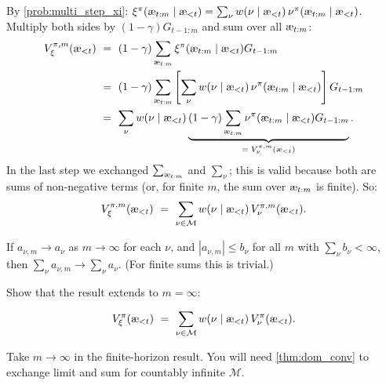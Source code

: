 \documentclass[fontsize=11pt, parskip=half]{scrartcl}
\newcommand{\cM}{\mathcal{M}}
\newcommand{\aes}{\textnormal{\ae}}
\begin{document}
\begin{solution}
By \cref{prob:multi_step_xi}: $\xi^\pi(\aes_{t:m} \mid \aes_{<t}) = \sum_\nu w(\nu \mid \aes_{<t})\, \nu^\pi(\aes_{t:m} \mid \aes_{<t})$.
Multiply both sides by $(1-\gamma)G_{t-1:m}$ and sum over all $\aes_{t:m}$:
\begin{align*}
    V_\xi^{\pi,m}(\aes_{<t})
    ~&=~ (1-\gamma) \sum_{\aes_{t:m}} \xi^\pi(\aes_{t:m} \mid \aes_{<t}) G_{t-1:m} \\
    ~&=~ (1-\gamma) \sum_{\aes_{t:m}} \left[\sum_\nu w(\nu \mid \aes_{<t})\, \nu^\pi(\aes_{t:m} \mid \aes_{<t})\right] G_{t-1:m} \\
    ~&=~ \sum_\nu w(\nu \mid \aes_{<t}) \underbrace{(1-\gamma) \sum_{\aes_{t:m}} \nu^\pi(\aes_{t:m} \mid \aes_{<t}) G_{t-1:m}}_{=\; V_\nu^{\pi,m}(\aes_{<t})}.
\end{align*}
In the last step we exchanged $\sum_{\aes_{t:m}}$ and $\sum_\nu$; this is valid because both are sums of non-negative terms (or, for finite $m$, the sum over $\aes_{t:m}$ is finite). So:
\[
    V_\xi^{\pi,m}(\aes_{<t}) ~=~ \sum_{\nu \in \cM} w(\nu \mid \aes_{<t})\, V_\nu^{\pi,m}(\aes_{<t}).
\]
\end{solution}

\begin{fact}\label{thm:dom_conv}
If $a_{\nu,m} \to a_\nu$ as $m \to \infty$ for each $\nu$, and $|a_{\nu,m}| \leq b_\nu$ for all $m$ with $\sum_\nu b_\nu < \infty$, then $\sum_\nu a_{\nu,m} \to \sum_\nu a_\nu$.
(For finite sums this is trivial.)
\end{fact}

\begin{exercise}
\label{prob:linearity_inf}
\skippable
Show that the result extends to $m = \infty$:

\[
    V_\xi^\pi(\aes_{<t})
    ~=~ \sum_{\nu \in \cM} w(\nu \mid \aes_{<t})\, V_\nu^\pi(\aes_{<t}).
\]

\begin{hint}
Take $m \to \infty$ in the finite-horizon result. You will need \cref{thm:dom_conv} to exchange limit and sum
for countably infinite $\cM$.
\end{hint}
\end{exercise}
\end{document}
